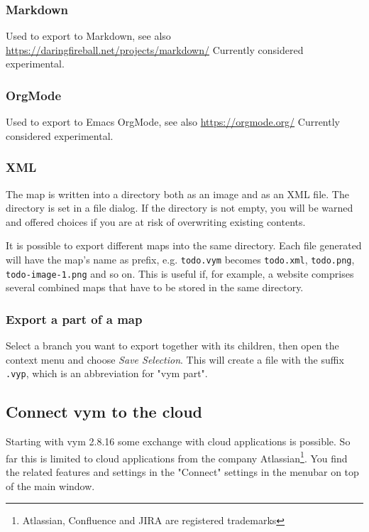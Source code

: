 \documentclass[12pt,a4paper]{article}
\newcommand{\vym}{{\sc vym }}
\begin{document}
\subsubsection{Markdown}
Used to export to Markdown, see also
\href{https://daringfireball.net/projects/markdown/}{https://daringfireball.net/projects/markdown/}
Currently considered experimental.

\subsubsection{OrgMode}
Used to export to Emacs OrgMode, see also
\href{https://orgmode.org/}{https://orgmode.org/}
Currently considered experimental.


\subsubsection{XML} \label{xmlexport}
The map is written into a directory both as an image and as an XML file.
The directory is set in a file dialog. If the directory is not empty,
you will be warned and offered choices if you are at risk of overwriting
existing contents.

It is possible to export different maps into the same directory. Each
file generated will have the map's name as prefix, e.g. {\tt todo.vym}
becomes {\tt todo.xml}, {\tt todo.png}, {\tt todo-image-1.png} and so
on. This is useful if, for example, a website comprises several combined
maps that have to be stored in the same directory.

\subsubsection{Export a part of a map}
Select a branch you want to export together with its children, then open
the context menu and choose {\em Save Selection}. This will create a
file with the suffix {\tt .vyp}, which is an abbreviation for "vym
part".

\subsection{Connect vym to the cloud}  \label{cloud}
Starting with \vym 2.8.16 some exchange with cloud applications is
possible. So far this is limited to cloud applications from the company
Atlassian\footnote{Atlassian, Confluence and JIRA are registered
trademarks}. You find the related features and settings in the "Connect"
settings in the menubar on top of the main window.
\end{document}

